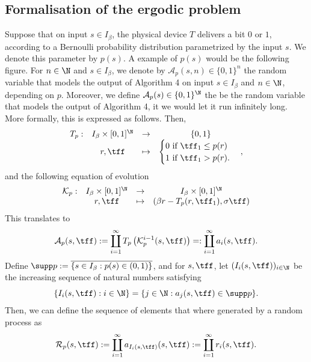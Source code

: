 \subsection{Formalisation of the ergodic problem}
Suppose that on input $s \in I_\beta$, the physical device $T$ delivers a bit $0$ or $1$, according to a Bernoulli probability distribution parametrized by the input $s$. We denote this parameter by $p(s)$. A example of $p(s)$ would be the following figure. For $n \in \N$ and $s \in I_\beta$, we denote by $\mathcal A_p(s,n) \in \{0,1\}^n$ the random variable that models the output of Algorithm 4 on input $s \in I_\beta$ and $n \in \N$, depending on $p$. Moreover, we define $\mathcal A_p(s) \in \{0,1\}^\N$ the be the random variable that models the output of Algorithm 4, it we would let it run infinitely long. More formally, this is expressed as follows. Then,
\begin{equation}
    \begin{array}{rccc}
        T_p : & I_\beta \times [0,1]^\N & \to & \{0,1\}\\
                       & r, \tff & \mapsto & \displaystyle  
                       \begin{cases}
                        0 \text{ if } \tff_1 \leq p(r)\\
                        1 \text{ if } \tff_1 > p(r).
                       \end{cases},
    \end{array}
\end{equation}
and the following equation of evolution
\begin{equation}
    \begin{array}{rccc}
        \mathcal K_p : & I_\beta \times [0,1]^\N & \to & I_\beta \times [0,1]^\N\\
                       & r, \tff &\displaystyle \mapsto &  \left(\beta r - T_p(r,\tff_1), \sigma \tff\right)
    \end{array}
\end{equation}
This translates to 
\begin{equation}
    \mathcal A_p(s, \tff) := \coprod_{i=1}^\infty T_p\left( \mathcal K_p^{i-1}(s, \tff)\right) =: \coprod_{i=1}^\infty a_i(s, \tff).
\end{equation}
Define $\supp p := \overline{\{s \in I_\beta : p(s) \in (0,1)\}}$, and for $s, \tff$, let $(I_i(s,\tff))_{i \in \N}$ be the increasing sequence of natural numbers satisfying 
\begin{equation}
    \{I_i(s,\tff) : i \in \N\} = \{ j \in \N : a_j(s,\tff) \in \supp p\}.
\end{equation}
Then, we can define the sequence of elements that where generated by a random process as 
\begin{equation}
    \mathcal R_p(s, \tff) := \coprod_{i=1}^\infty a_{I_i(s,\tff)}(s, \tff) := \coprod_{i=1}^\infty r_i(s, \tff).
\end{equation}

